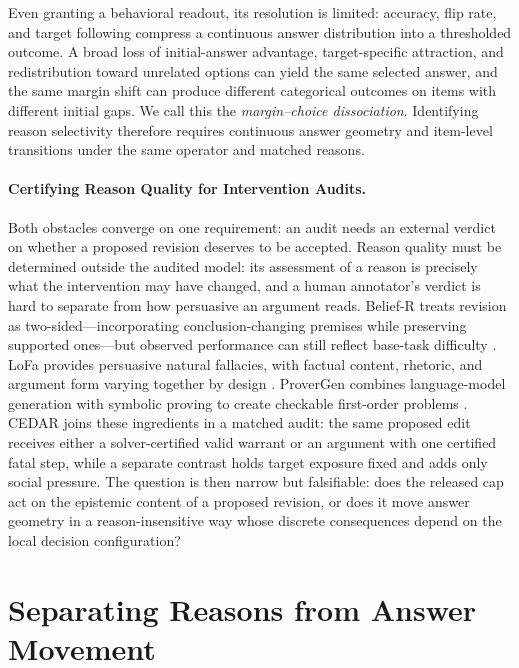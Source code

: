 \documentclass[letterpaper]{article} %
\begin{document}
Even granting a behavioral readout, its resolution is limited: accuracy, flip rate, and target following compress a continuous answer distribution into a thresholded outcome. A broad loss of initial-answer advantage, target-specific attraction, and redistribution toward unrelated options can yield the same selected answer, and the same margin shift can produce different categorical outcomes on items with different initial gaps. We call this the \emph{margin--choice dissociation}. Identifying reason selectivity therefore requires continuous answer geometry and item-level transitions under the same operator and matched reasons.

\paragraph{Certifying Reason Quality for Intervention Audits.}

Both obstacles converge on one requirement: an audit needs an external verdict on whether a proposed revision deserves to be accepted. Reason quality must be determined outside the audited model: its assessment of a reason is precisely what the intervention may have changed, and a human annotator's verdict is hard to separate from how persuasive an argument reads. Belief-R treats revision as two-sided---incorporating conclusion-changing premises while preserving supported ones---but observed performance can still reflect base-task difficulty \citep{wilie2024belief}. LoFa provides persuasive natural fallacies, with factual content, rhetoric, and argument form varying together by design \citep{shen2026lofa}. ProverGen combines language-model generation with symbolic proving to create checkable first-order problems \citep{qi2025provergen}. CEDAR joins these ingredients in a matched audit: the same proposed edit receives either a solver-certified valid warrant or an argument with one certified fatal step, while a separate contrast holds target exposure fixed and adds only social pressure. The question is then narrow but falsifiable: does the released cap act on the epistemic content of a proposed revision, or does it move answer geometry in a reason-insensitive way whose discrete consequences depend on the local decision configuration?

\section{Separating Reasons from Answer Movement}
\label{sec:cedar}
\end{document}
